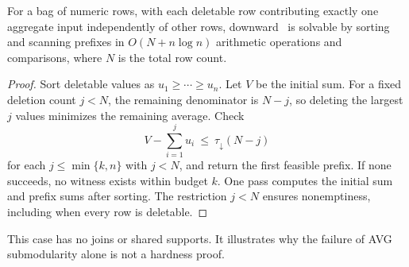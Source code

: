 \begin{proposition}
\label{prop:avg-rows}
For a bag of numeric rows, with each deletable row contributing exactly
one aggregate input independently of other rows, downward 
\MIW\ is solvable by sorting and scanning prefixes in $O(N+n\log n)$
arithmetic operations and comparisons, where $N$ is the total row count.
\end{proposition}
\begin{proof}
Sort deletable values as $u_1\ge\cdots\ge u_n$. Let $V$ be the initial
sum. For a fixed deletion count $j<N$, the remaining denominator is
$N-j$, so deleting the largest $j$ values minimizes the remaining
average. Check
\[
V-\sum_{i=1}^j u_i\ \le\ \tau_{\downarrow}(N-j)
\]
for each $j\le\min\{k,n\}$ with $j<N$, and return the first feasible
prefix. If none succeeds, no witness exists within budget $k$. One pass computes the
initial sum and prefix sums after sorting. The restriction $j<N$
ensures nonemptiness, including when every row is deletable.
\end{proof}
This case has no joins or shared supports. It illustrates why the failure
of AVG submodularity alone is not a hardness proof.
